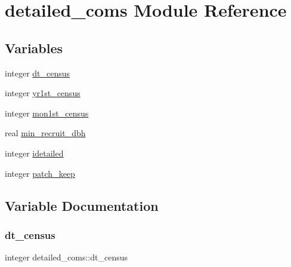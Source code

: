 \hypertarget{namespacedetailed__coms}{}\section{detailed\+\_\+coms Module Reference}
\label{namespacedetailed__coms}
\subsection*{Variables}
\begin{DoxyCompactItemize}
\item 
integer \hyperlink{namespacedetailed__coms_a5d3b59a9d43ec5865a4be92ffdde1982}{dt\+\_\+census}
\item 
integer \hyperlink{namespacedetailed__coms_ad52c2a6c02170c71e22316df2c842b91}{yr1st\+\_\+census}
\item 
integer \hyperlink{namespacedetailed__coms_a7101fa67abae725580d0c44df3fd9845}{mon1st\+\_\+census}
\item 
real \hyperlink{namespacedetailed__coms_af27afe5cb99befa2f9c910987d214757}{min\+\_\+recruit\+\_\+dbh}
\item 
integer \hyperlink{namespacedetailed__coms_a600c197b688f861519c7fc669706c166}{idetailed}
\item 
integer \hyperlink{namespacedetailed__coms_a6541b50f2722b8a83448571dc25934aa}{patch\+\_\+keep}
\end{DoxyCompactItemize}


\subsection{Variable Documentation}
\mbox{\label{namespacedetailed__coms_a5d3b59a9d43ec5865a4be92ffdde1982}} 
\subsubsection{\texorpdfstring{dt\+\_\+census}{dt\_census}}
{\footnotesize\ttfamily integer detailed\+\_\+coms\+::dt\+\_\+census}

\mbox{\label{namespacedetailed__coms_a600c197b688f861519c7fc669706c166}} 
